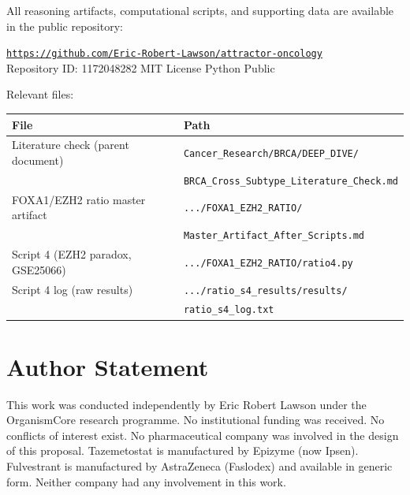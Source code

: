 \documentclass[12pt, a4paper]{article}
\begin{document}
All reasoning artifacts, computational scripts, and
supporting data are available in the public repository:

\begin{center}
\href{https://github.com/Eric-Robert-Lawson/attractor-oncology}
{\texttt{https://github.com/Eric-Robert-Lawson/attractor-oncology}}\\[0.3em]
\small Repository ID: 1172048282 \textbar{}
MIT License \textbar{}
Python \textbar{}
Public
\end{center}

\noindent Relevant files:

\begin{center}
\begin{tabular}{ll}
\toprule
\textbf{File} & \textbf{Path} \\
\midrule
Literature check (parent document)
& \texttt{Cancer\_Research/BRCA/DEEP\_DIVE/}\\
& \texttt{BRCA\_Cross\_Subtype\_Literature\_Check.md} \\
FOXA1/EZH2 ratio master artifact
& \texttt{.../FOXA1\_EZH2\_RATIO/}\\
& \texttt{Master\_Artifact\_After\_Scripts.md} \\
Script 4 (EZH2 paradox, GSE25066)
& \texttt{.../FOXA1\_EZH2\_RATIO/ratio4.py} \\
Script 4 log (raw results)
& \texttt{.../ratio\_s4\_results/results/}\\
& \texttt{ratio\_s4\_log.txt} \\
\bottomrule
\end{tabular}
\end{center}

\section*{Author Statement}

This work was conducted independently by Eric Robert
Lawson under the OrganismCore research programme.
No institutional funding was received. No conflicts
of interest exist. No pharmaceutical company was
involved in the design of this proposal.
Tazemetostat is manufactured by Epizyme (now Ipsen).
Fulvestrant is manufactured by AstraZeneca (Faslodex)
and available in generic form. Neither company had
any involvement in this work.
\end{document}
